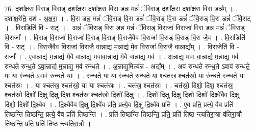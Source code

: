 \documentclass[17pt]{extarticle}
\begin{document}
76. दशा᳚क्षरा वि॒राड् वि॒राड् दशा᳚क्षरा॒ दशा᳚क्षरा वि॒रा डन्न॒ मन्नं॑ ॅवि॒राड् दशा᳚क्षरा॒ दशा᳚क्षरा वि॒रा डन्न᳚म् । . दशा᳚क्ष॒रेति॒ दश॑ - अ॒क्ष॒रा॒ । . वि॒रा डन्न॒ मन्नं॑ ॅवि॒राड् वि॒रा डन्नं॑ ॅवि॒राड् वि॒रा डन्नं॑ ॅवि॒राड् वि॒रा डन्नं॑ ॅवि॒राट् । . वि॒राडिति॑ वि - राट् । . अन्नं॑ ॅवि॒राड् वि॒रा डन्न॒ मन्नं॑ ॅवि॒राड् वि॒राजा॑ वि॒राजा॑ वि॒रा डन्न॒ मन्नं॑ ॅवि॒राड् वि॒राजा᳚ । . वि॒राड् वि॒राजा॑ वि॒राजा॑ वि॒राड् वि॒राड् वि॒राजै॒वैव वि॒राजा॑ वि॒राड् वि॒राड् वि॒रा जै॒व । . वि॒राडिति॑ वि - राट् । . वि॒राजै॒वैव वि॒राजा॑ वि॒राजै॒ वान्नाद्य॑ म॒न्नाद्य॑ मे॒व वि॒राजा॑ वि॒राजै॒ वान्नाद्य᳚म् । . वि॒राजेति॑ वि - राजा᳚ । . ए॒वान्नाद्य॑ म॒न्नाद्य॑ मे॒वै वान्नाद्य॒ मवावा॒न्नाद्य॑ मे॒वै वान्नाद्य॒ मव॑ । . अ॒न्नाद्य॒ मवा वा॒न्नाद्य॑ म॒न्नाद्य॒ मव॑ रुन्धते रुन्ध॒ते ऽवा॒न्नाद्य॑ म॒न्नाद्य॒ मव॑ रुन्धते । . अ॒न्नाद्य॒मित्य॑न्न - अद्य᳚म् । . अव॑ रुन्धते रुन्ध॒ते ऽवाव॑ रुन्धते॒ या या रु॑न्ध॒ते ऽवाव॑ रुन्धते॒ याः । . रु॒न्ध॒ते॒ या या रु॑न्धते रुन्धते॒ या श्चत॑स्र॒ श्चत॑स्रो॒ या रु॑न्धते रुन्धते॒ या श्चत॑स्रः । . या श्चत॑स्र॒ श्चत॑स्रो॒ या या श्चत॑स्रः । . चत॑स्र॒ श्चत॑स्रः । . चत॑स्रो॒ दिशो॒ दिश॒ श्चत॑स्र॒ श्चत॑स्रो॒ दिशो॑ दि॒क्षु दि॒क्षु दिश॒ श्चत॑स्र॒ श्चत॑स्रो॒ दिशो॑ दि॒क्षु । . दिशो॑ दि॒क्षु दि॒क्षु दिशो॒ दिशो॑ दि॒क्ष्वे॑वैव दि॒क्षु दिशो॒ दिशो॑ दि॒क्ष्वे॑व । . दि॒क्ष्वे॑वैव दि॒क्षु दि॒क्ष्वे॑व प्रति॒ प्रत्ये॒व दि॒क्षु दि॒क्ष्वे॑व प्रति॑ । . ए॒व प्रति॒ प्रत्ये॒ वैव प्रति॑ तिष्ठन्ति तिष्ठन्ति॒ प्रत्ये॒ वैव प्रति॑ तिष्ठन्ति । . प्रति॑ तिष्ठन्ति तिष्ठन्ति॒ प्रति॒ प्रति॑ तिष्ठ न्त्यतिरा॒त्रा व॑तिरा॒त्रौ ति॑ष्ठन्ति॒ प्रति॒ प्रति॑ तिष्ठ न्त्यतिरा॒त्रौ । \newline
\end{document}
